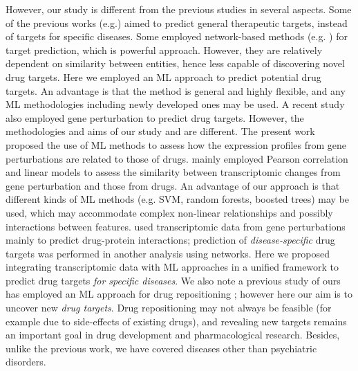     However, our study is different from the previous studies in several aspects. Some of the previous works (e.g.\cite {ferrero2017silico, bakheet2009properties, kumari2015identification, li2007prediction}) aimed to predict general therapeutic targets, instead of targets for specific diseases. Some employed network-based methods (e.g. \cite{sawada2018predicting, li2015large, emig2013drug}) for target prediction, which is powerful approach. However, they are relatively dependent on similarity between entities, hence less capable of discovering novel drug targets. Here we employed an ML approach to predict potential drug targets. An advantage is that the method is general and highly flexible, and any ML methodologies including newly developed ones may be used. A recent study  \cite{sawada2018predicting} also employed gene perturbation to predict drug targets. However, the methodologies and aims of our study and \cite{sawada2018predicting} are different. The present work proposed the use of ML methods to assess how the expression profiles from gene perturbations are related to those of drugs. \cite{sawada2018predicting} mainly employed Pearson correlation and linear models to assess the similarity between transcriptomic changes from gene perturbation and those from drugs. An advantage of our approach is that different kinds of ML methods (e.g. SVM, random forests, boosted trees) may be used, which may accommodate complex non-linear relationships and possibly interactions between features.  \cite {sawada2018predicting} used transcriptomic data from gene perturbations mainly to predict drug-protein interactions; prediction of \textit{disease-specific} drug targets was performed in another analysis using networks. Here we proposed integrating transcriptomic data with ML approaches in a unified framework to predict drug targets \textit{ for specific diseases}. We also note a previous study of ours has employed an ML approach for drug repositioning \cite{zhao2018drug}; however here our aim is to uncover new \textit{drug targets}. Drug repositioning may not always be feasible (for example due to side-effects of existing drugs), and revealing new targets remains an important goal in drug development and pharmacological research. Besides, unlike the previous work, we have covered diseases other than psychiatric disorders. 
    
